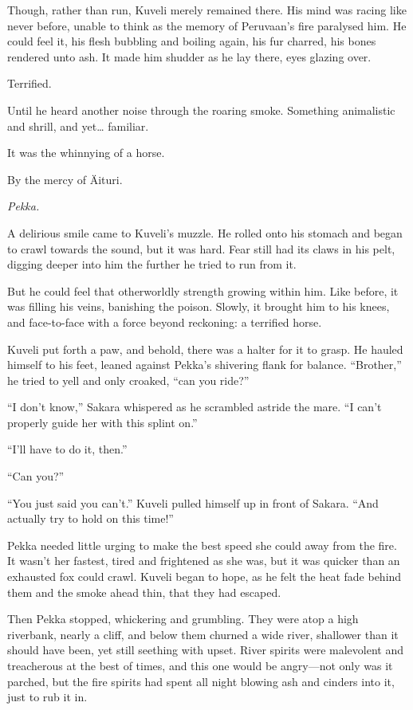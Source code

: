 Though, rather than run, Kuveli merely remained there. His mind was racing like never before, unable to think as the memory of Peruvaan's fire paralysed him. He could feel it, his flesh bubbling and boiling again, his fur charred, his bones rendered unto ash. It made him shudder as he lay there, eyes glazing over.

Terrified.

Until he heard another noise through the roaring smoke. Something animalistic and shrill, and yet\ldots{} familiar.

It was the whinnying of a horse.

By the mercy of Äituri.

\emph{Pekka.}

A delirious smile came to Kuveli's muzzle. He rolled onto his stomach and began to crawl towards the sound, but it was hard. Fear still had its claws in his pelt, digging deeper into him the further he tried to run from it.

But he could feel that otherworldly strength growing within him. Like before, it was filling his veins, banishing the poison. Slowly, it brought him to his knees, and face-to-face with a force beyond reckoning: a terrified horse.

Kuveli put forth a paw, and behold, there was a halter for it to grasp. He hauled himself to his feet, leaned against Pekka's shivering flank for balance. ``Brother,'' he tried to yell and only croaked, ``can you ride?''

``I don't know,'' Sakara whispered as he scrambled astride the mare. ``I can't properly guide her with this splint on.''

``I'll have to do it, then.''

``Can you?''

``You just said you can't.'' Kuveli pulled himself up in front of Sakara. ``And actually try to hold on this time!''

Pekka needed little urging to make the best speed she could away from the fire. It wasn't her fastest, tired and frightened as she was, but it was quicker than an exhausted fox could crawl. Kuveli began to hope, as he felt the heat fade behind them and the smoke ahead thin, that they had escaped.

Then Pekka stopped, whickering and grumbling. They were atop a high riverbank, nearly a cliff, and below them churned a wide river, shallower than it should have been, yet still seething with upset. River spirits were malevolent and treacherous at the best of times, and this one would be angry---not only was it parched, but the fire spirits had spent all night blowing ash and cinders into it, just to rub it in.

